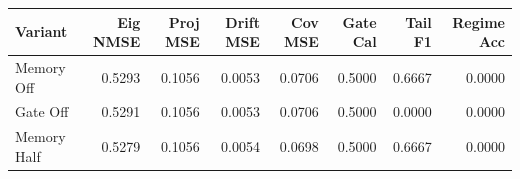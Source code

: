 \begin{tabular}{lrrrrrrr}
\toprule
Variant & Eig NMSE & Proj MSE & Drift MSE & Cov MSE & Gate Cal & Tail F1 & Regime Acc \\
\midrule
Memory Off & 0.5293 & 0.1056 & 0.0053 & 0.0706 & 0.5000 & 0.6667 & 0.0000 \\
Gate Off & 0.5291 & 0.1056 & 0.0053 & 0.0706 & 0.5000 & 0.0000 & 0.0000 \\
Memory Half & 0.5279 & 0.1056 & 0.0054 & 0.0698 & 0.5000 & 0.6667 & 0.0000 \\
\bottomrule
\end{tabular}